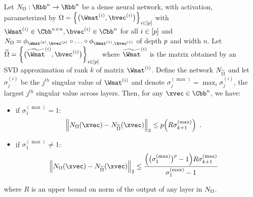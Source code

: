 \begin{proposition} \label{proposition:ch4-approximation_network_dense_to_low_rank}
  Let $\nn_\Omega: \Rbb^n \rightarrow \Rbb^n$ be a dense neural network, with \relu activation, parameterized by $\Omega = \left\{ \big(\Wmat^{(i)},\bvec^{(i)} \big) \right\}_{i \in [\depth]}$ with $\Wmat^{(i)} \in \Cnn, \bvec^{(i)} \in \Cn$ for all $i \in [p]$ and $\nn_\Omega = \layer_{\Wmat^{(\depth)},\bvec^{(\depth)}} \circ \ldots \circ \layer_{\Wmat^{(1)},\bvec^{(1)}}$ of depth $p$ and width $n$.
  Let $\widetilde{\Omega} = \left\{ \big( \widetilde{\Wmat}^{(i)},\bvec^{(i)} \big) \right\}_{i \in [\depth]}$ where $\widetilde{\Wmat}^{(i)}$ is the matrix obtained by an SVD approximation of rank $k$ of matrix $\Wmat^{(i)}$. 
  Define the network $N_{\widetilde{\Omega}}$ and let $\sigma_{j}^{(i)}$ be the $j^{th}$ singular value of $\Wmat^{(i)}$ and denote $\sigma_j^{(\max)} = \max_i \sigma_j^{(i)}$, the largest $j^{th}$ singular value across layers.
  Then, for any $\xvec \in \Cn$, we have:
  \begin{itemize}
    \item if $\sigma_{1}^{(\max)} = 1$:
      \begin{equation}
	\norm{ \nn_\Omega(\xvec) - \nn_{\widetilde{\Omega}}(\xvec)}_2 \le \depth \left(  R \sigma_{k+1}^{(\max)} \right) \enspace.
      \end{equation}
    \item if $\sigma_{1}^{(\max)} \neq 1$:
      \begin{equation}
	\norm{ \nn_\Omega(\xvec) - \nn_{\widetilde{\Omega}}(\xvec)}_2 \le \frac{\left( \big(\sigma_{1}^{(\max)}\big)^\depth - 1 \right) R \sigma_{k+1}^{(\max)}}{\sigma_{1}^{(\max)} - 1}
      \end{equation}
  \end{itemize}
  where $R$ is an upper bound on norm of the output of any layer in $N_\Omega$.
\end{proposition}

